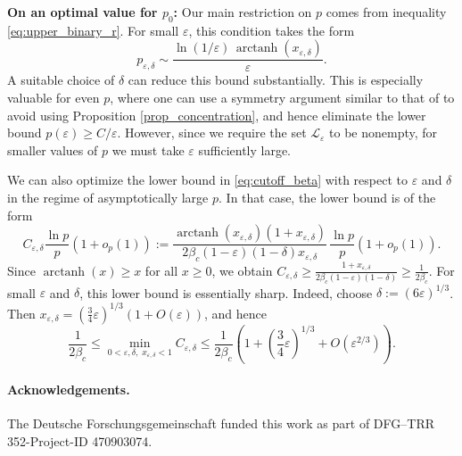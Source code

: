 \documentclass[letterpaper, DIV=17]{scrartcl}
\numberwithin{equation}{section}
\theoremstyle{definition}
\newcommand{\eps}{\varepsilon}
\DeclareMathOperator\arctanh{arctanh}
\begin{document}
\textbf{On an optimal value for $p_0$:}
Our main restriction on $p$ comes from inequality \eqref{eq:upper_binary_r}. For small $\eps$, this condition takes the form
\[
p_{\eps,\delta}\sim \frac{\ln(1/\eps)\,\arctanh(x_{\eps,\delta})}{\eps}.
\]
A suitable choice of $\delta$ can reduce this bound substantially. This is especially valuable for even \(p\), where one can use a symmetry argument similar to that of \cite{S25} to avoid using Proposition \ref{prop_concentration}, and hence eliminate the lower bound \(p(\eps) \ge C/\eps\). However, since we require the set \(\mathcal{L}_\eps\) to be nonempty, for smaller values of $p$ we must take \(\eps\) sufficiently large.

We can also optimize the lower bound in \eqref{eq:cutoff_beta} with respect to $\eps$ and $\delta$ in the regime of asymptotically large $p$. In that case, the lower bound is of the form
\[
C_{\eps,\delta}\frac{\ln p}{p}(1+o_p(1)):=\frac{\arctanh(x_{\eps,\delta})(1+x_{\eps,\delta})}{2\beta_c(1-\eps)(1-\delta)x_{\eps,\delta}}\,
\frac{\ln p}{p}(1+o_p(1)).
\]
Since $\arctanh(x)\geq x$ for all $x\geq 0$, we obtain
$
C_{\eps,\delta}\geq 
\frac{1+x_{\eps,\delta}}{2\beta_c(1-\eps)(1-\delta)}
\geq 
\frac{1}{2\beta_c} $. 
For small $\eps$ and $\delta$, this lower bound is essentially sharp. Indeed, choose
$\delta:=(6\eps)^{1/3}$. Then
$x_{\eps,\delta}=\left(\frac{3}{4}\eps\right)^{1/3}(1+O(\eps))$,
and hence
\[
\frac{1}{2\beta_c}
\leq
\min_{0<\eps,\delta,\;x_{\eps,\delta}<1} C_{\eps,\delta}
\leq
\frac{1}{2\beta_c}\left(1+\left(\frac{3}{4}\eps\right)^{1/3}+O(\eps^{2/3})\right).
\]

\paragraph{Acknowledgements.} The Deutsche Forschungsgemeinschaft funded this work as part of DFG–TRR 352\--Project-ID 470903074. 

{}

\end{document}
